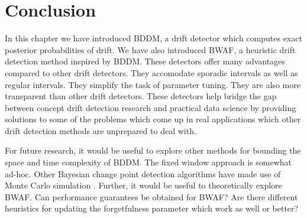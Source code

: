 
\section{Conclusion} \label{BDD:conclusion}

In this chapter we have introduced BDDM, a drift detector which computes exact posterior probabilities of drift. We have also introduced BWAF, a heuristic drift detection method inspired by BDDM. These detectors offer many advantages compared to other drift detectors. They accomodate sporadic intervals as well as regular intervals. They simplify the task of parameter tuning. They are also more transparent than other drift detectors. These detectors help bridge the gap between concept drift detection research and practical data science by providing solutions to some of the problems which come up in real applications which other drift detection methods are unprepared to deal with.

For future research, it would be useful to explore other methods for bounding the space and time complexity of BDDM. The fixed window approach is somewhat ad-hoc. Other Bayesian change point detection algorithms have made use of Monte Carlo simulation \cite{BCMC}. Further, it would be useful to theoretically explore BWAF. Can performance guarantees be obtained for BWAF? Are there different heuristics for updating the forgetfulness parameter which work as well or better?